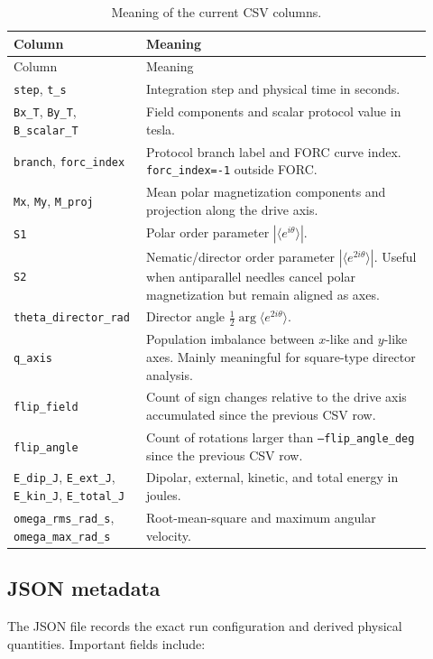 \documentclass[11pt,a4paper]{article}
\newcommand{\code}[1]{\texttt{#1}}
\begin{document}
\begin{longtable}{p{0.26\linewidth}p{0.66\linewidth}}
\caption{Meaning of the current CSV columns.}\label{tab:csv_columns}\\
\toprule
Column & Meaning \\
\midrule
\endfirsthead
\toprule
Column & Meaning \\
\midrule
\endhead
\code{step}, \code{t\_s} & Integration step and physical time in seconds. \\
\code{Bx\_T}, \code{By\_T}, \code{B\_scalar\_T} & Field components and scalar protocol value in tesla. \\
\code{branch}, \code{forc\_index} & Protocol branch label and FORC curve index. \code{forc\_index=-1} outside FORC. \\
\code{Mx}, \code{My}, \code{M\_proj} & Mean polar magnetization components and projection along the drive axis. \\
\code{S1} & Polar order parameter $|\langle e^{i\theta}\rangle|$. \\
\code{S2} & Nematic/director order parameter $|\langle e^{2i\theta}\rangle|$. Useful when antiparallel needles cancel polar magnetization but remain aligned as axes. \\
\code{theta\_director\_rad} & Director angle $\frac{1}{2}\arg\langle e^{2i\theta}\rangle$. \\
\code{q\_axis} & Population imbalance between $x$-like and $y$-like axes. Mainly meaningful for square-type director analysis. \\
\code{flip\_field} & Count of sign changes relative to the drive axis accumulated since the previous CSV row. \\
\code{flip\_angle} & Count of rotations larger than \code{--flip\_angle\_deg} since the previous CSV row. \\
\code{E\_dip\_J}, \code{E\_ext\_J}, \code{E\_kin\_J}, \code{E\_total\_J} & Dipolar, external, kinetic, and total energy in joules. \\
\code{omega\_rms\_rad\_s}, \code{omega\_max\_rad\_s} & Root-mean-square and maximum angular velocity. \\
\bottomrule
\end{longtable}

\subsection{JSON metadata}

The JSON file records the exact run configuration and derived physical quantities. Important fields include:
\end{document}
